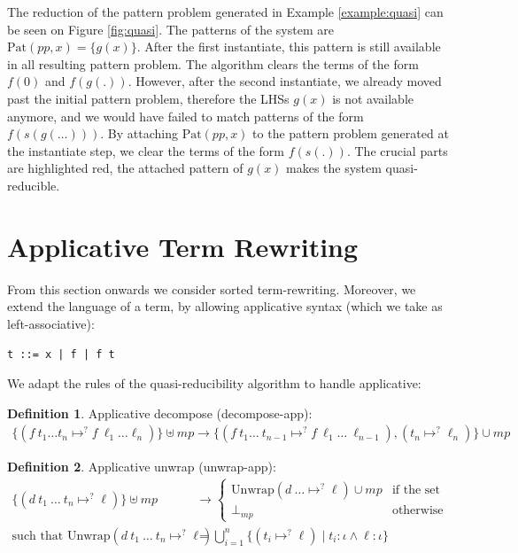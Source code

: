 \documentclass{report}
\theoremstyle{definition}
\newtheorem{definition_inner}{Definition}
\newenvironment{definition}
  {\begin{customblock}\begin{definition_inner}}
  {\end{definition_inner}\end{customblock}}
\begin{document}
The reduction of the pattern problem generated in Example \ref{example:quasi} can be seen on Figure \ref{fig:quasi}. The patterns of the system are $\text{Pat}(pp, x) = \{g(x)\}$. After the first instantiate, this pattern is still available in all resulting pattern problem. The algorithm clears the terms of the form $f(0)$ and $f(g(.))$. However, after the second instantiate, we already moved past the initial pattern problem, therefore the LHSs $g(x)$ is not available anymore, and we would have failed to match patterns of the form $f(s(g(\dots)))$. By attaching $\text{Pat}(pp, x)$ to the pattern problem generated at the instantiate step, we clear the terms of the form $f(s(.))$. The crucial parts are highlighted red, the attached pattern of $g(x)$ makes the system quasi-reducible.

\FloatBarrier

\section{Applicative Term Rewriting}\label{section:quasi-app}

From this section onwards we consider sorted term-rewriting. Moreover, we extend the language of a term, by allowing applicative syntax (which we take as left-associative):
\begin{center}
    \texttt{t ::= x | f | f t}
\end{center}

We adapt the rules of the quasi-reducibility algorithm to handle applicative:

\begin{definition}\label{def:applicative-decompose}
Applicative decompose (decompose-app):
\begin{align*}
\{(f\ t_1 \dots t_n \mapsto^? f\ \ell_1 \dots \ell_n)\} \uplus mp \rightarrow \{(f\ t_1 \dots\ t_{n-1} \mapsto^? f\ \ell_1 \dots\ \ell_{n-1}), (t_n\mapsto^? \ell_n)\} \cup mp
\end{align*}
\end{definition}

\begin{definition}\label{def:applicative-unwrap}
Applicative unwrap (unwrap-app):
\begin{align*}
\{(d\ t_1\ \dots\ t_n\mapsto^? \ell)\} \uplus mp 
&\rightarrow
\begin{cases}
 \mathrm{Unwrap}(d\ \dots\mapsto^? \ell) \cup mp &  \text{if the set Unwrap is non-empty} \\
\bot_{mp} & \text{otherwise}
\end{cases} \\
\text{such that }\mathrm{Unwrap}(d\ t_1\ \dots\ t_n\mapsto^? \ell) &= \bigcup_{i=1}^n \{(t_i\mapsto^? \ell) \mid t_i : \iota \wedge \ell : \iota\}
\end{align*}
\end{definition}
\end{document}
